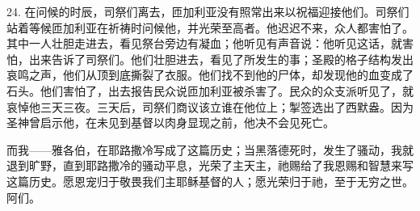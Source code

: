 24. 在问候的时辰，司祭们离去，匝加利亚没有照常出来以祝福迎接他们。司祭们站着等候匝加利亚在祈祷时问候他，并光荣至高者。他迟迟不来，众人都害怕了。其中一人壮胆走进去，看见祭台旁边有凝血；他听见有声音说：他听见这话，就害怕，出来告诉了司祭们。他们壮胆进去，看见了所发生的事；圣殿的格子结构发出哀鸣之声，他们从顶到底撕裂了衣服。他们找不到他的尸体，却发现他的血变成了石头。他们害怕了，出去报告民众说匝加利亚被杀害了。民众的众支派听见了，就哀悼他三天三夜。三天后，司祭们商议该立谁在他位上；掣签选出了西默盎。因为圣神曾启示他，在未见到基督以肉身显现之前，他决不会见死亡。\par

而我——雅各伯，在耶路撒冷写成了这篇历史；当黑落德死时，发生了骚动，我就退到旷野，直到耶路撒冷的骚动平息，光荣了主天主，祂赐给了我恩赐和智慧来写这篇历史。愿恩宠归于敬畏我们主耶稣基督的人；愿光荣归于祂，至于无穷之世。阿们。\par

